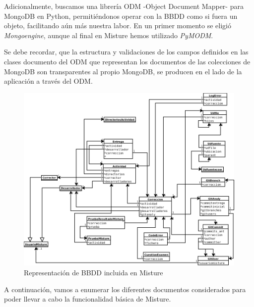 Adicionalmente, buscamos una librería ODM -Object Document Mapper- para MongoDB en Python, permitiéndonos operar con la BBDD como si fuera un objeto, facilitando aún más nuestra labor. En un primer momento se eligió \textit{Mongoengine}, aunque al final en Misture hemos utilizado \textit{PyMODM}.


Se debe recordar, que la estructura y validaciones de los campos definidos en las clases documento del ODM que representan los documentos de las colecciones de MongoDB son transparentes al propio MongoDB, se producen en el lado de la aplicación a través del ODM.

\begin{figure}[H]
   \centering
   \includegraphics[width=16cm]{img/Diagram4_bbdd}
   \caption{Representación de BBDD incluida en Misture}
   \label{figura:bbdd}
\end{figure}

\vspace{3cm}

A continuación, vamos a enumerar los diferentes documentos considerados para poder llevar a cabo la funcionalidad básica de Misture.

